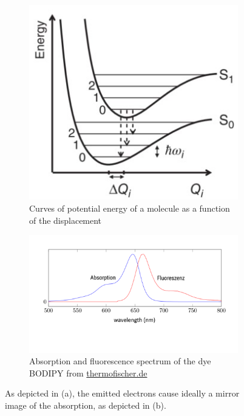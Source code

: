 \begin{figure}[h]
    \centering
    \begin{subfigure}[b]{0.3\textwidth}
        \includegraphics[width =\textwidth]{Bilder/Grundlagen/ElectronTransS0S1.jpg}      
        \caption{Curves of potential energy of a molecule as a function of the displacement
        }
      \label{fig:S0S1}
    \end{subfigure}
    \hspace{0.03\textwidth}
    \begin{subfigure}[b]{0.65\textwidth}
      \includegraphics[width = \textwidth]{Bilder/Grundlagen/EmssionAbs_cropped.pdf}      
      \caption{Absorption and fluorescence spectrum of the dye BODIPY from \url{thermofischer.de}}
      \label{fig:AbsEmi}
    \end{subfigure}
    \caption{As depicted in (a), the emitted electrons cause ideally a mirror image of the absorption, as depicted in (b).}
    \label{fig:TheoAbsEmi}
\end{figure}

